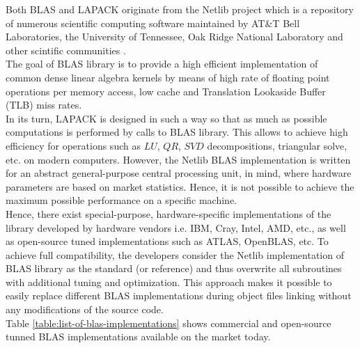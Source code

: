 Both BLAS and LAPACK originate from the Netlib project which is a repository of numerous scientific computing software maintained by AT\&T Bell Laboratories, the University of Tennessee, Oak Ridge National Laboratory and other scintific communities \cite{netlib-overview}.\\


The goal of BLAS library is to provide a high efficient implementation of common dense linear algebra kernels by means of high rate of floating point operations per memory access, low cache and Translation Lookaside Buffer (TLB) miss rates.\\


In its turn, LAPACK is designed in such a way so that as much as possible computations is performed by calls to BLAS library. This allows to achieve high efficiency for operations such as $LU$, $QR$, $SVD$ decompositions, triangular solve, etc. on modern computers. However, the Netlib BLAS implementation is written for an abstract general-purpose central processing unit, in mind, where hardware parameters are based on market statistics. Hence, it is not possible to achieve the maximum possible performance on a specific machine.\\


Hence, there exist special-purpose, hardware-specific implementations of the library developed by hardware vendors i.e. IBM, Cray, Intel, AMD, etc., as well as open-source tuned implementations such as ATLAS, OpenBLAS, etc. To achieve full compatibility, the developers consider the Netlib implementation of BLAS library as the standard (or reference) and thus overwrite all subroutines with additional tuning and optimization. This approach makes it possible to easily replace different BLAS implementations during object files linking  without any modifications of the source code.\\
 

Table \ref{table:list-of-blas-implementations} shows commercial and open-source tunned BLAS implementations available on the market today.\\

